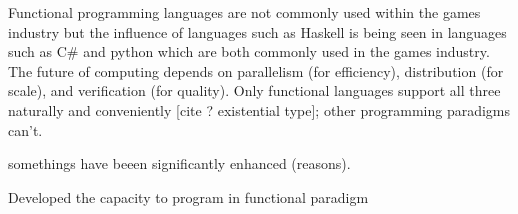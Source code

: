 \documentclass[main.tex]{subfiles}
\begin{document}
Functional programming languages are not commonly used within the games industry but the influence of languages such as Haskell is being seen in languages such as C# and python which are both commonly used in the games industry. The future of computing depends on parallelism (for efficiency), distribution (for scale), and verification (for quality).  Only functional languages support all three naturally and conveniently [cite ? existential type]; other programming paradigms can't.


somethings have beeen significantly enhanced (reasons).



Developed the capacity to program in functional paradigm



\end{document}
